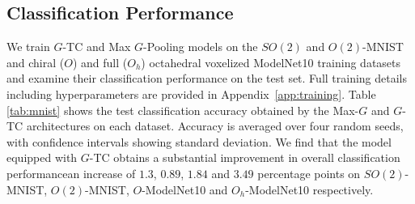 \subsection{Classification Performance}



We train $G$-TC and Max $G$-Pooling models on the $SO(2)$ and $O(2)$-MNIST and chiral ($O$) and full ($O_h$) octahedral voxelized ModelNet10 training datasets and examine their classification performance on the test set. Full training details including hyperparameters are provided in Appendix~\ref{app:training}. Table \ref{tab:mnist} shows the test classification accuracy obtained by the Max-$G$ and $G$-TC architectures on each dataset. Accuracy is averaged over four random seeds, with confidence intervals showing standard deviation. We find that the model equipped with $G$-TC obtains a substantial improvement in overall classification performance\textemdash an increase of $1.3$, $0.89$, $1.84$ and $3.49$ percentage points on $SO(2)$-MNIST, $O(2)$-MNIST, $O$-ModelNet10 and $O_h$-ModelNet10 respectively.


